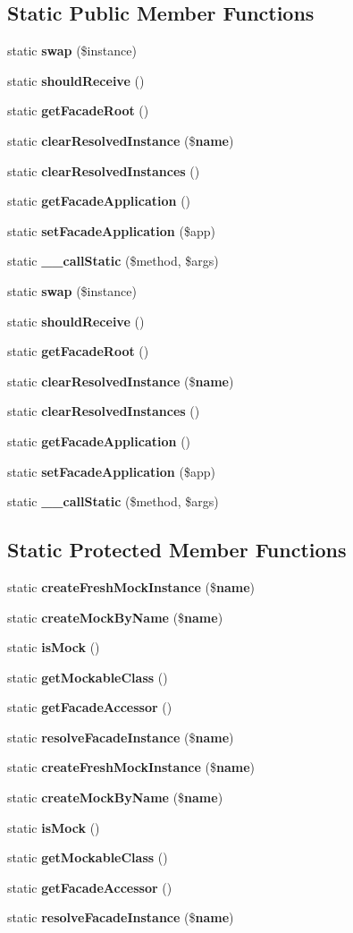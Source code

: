 \subsection*{Static Public Member Functions}
\begin{DoxyCompactItemize}
\item 
static {\bf swap} (\$instance)
\item 
static {\bf should\+Receive} ()
\item 
static {\bf get\+Facade\+Root} ()
\item 
static {\bf clear\+Resolved\+Instance} (\${\bf name})
\item 
static {\bf clear\+Resolved\+Instances} ()
\item 
static {\bf get\+Facade\+Application} ()
\item 
static {\bf set\+Facade\+Application} (\$app)
\item 
static {\bf \+\_\+\+\_\+call\+Static} (\$method, \$args)
\item 
static {\bf swap} (\$instance)
\item 
static {\bf should\+Receive} ()
\item 
static {\bf get\+Facade\+Root} ()
\item 
static {\bf clear\+Resolved\+Instance} (\${\bf name})
\item 
static {\bf clear\+Resolved\+Instances} ()
\item 
static {\bf get\+Facade\+Application} ()
\item 
static {\bf set\+Facade\+Application} (\$app)
\item 
static {\bf \+\_\+\+\_\+call\+Static} (\$method, \$args)
\end{DoxyCompactItemize}
\subsection*{Static Protected Member Functions}
\begin{DoxyCompactItemize}
\item 
static {\bf create\+Fresh\+Mock\+Instance} (\${\bf name})
\item 
static {\bf create\+Mock\+By\+Name} (\${\bf name})
\item 
static {\bf is\+Mock} ()
\item 
static {\bf get\+Mockable\+Class} ()
\item 
static {\bf get\+Facade\+Accessor} ()
\item 
static {\bf resolve\+Facade\+Instance} (\${\bf name})
\item 
static {\bf create\+Fresh\+Mock\+Instance} (\${\bf name})
\item 
static {\bf create\+Mock\+By\+Name} (\${\bf name})
\item 
static {\bf is\+Mock} ()
\item 
static {\bf get\+Mockable\+Class} ()
\item 
static {\bf get\+Facade\+Accessor} ()
\item 
static {\bf resolve\+Facade\+Instance} (\${\bf name})
\end{DoxyCompactItemize}
